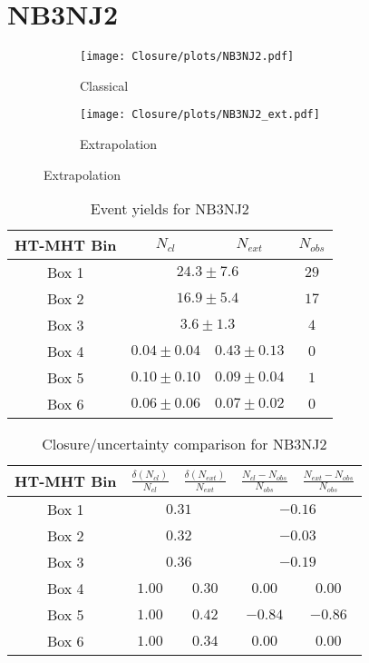\documentclass[11pt, oneside]{article}
\begin{document}
\clearpage


\section{NB3NJ2}

\begin{figure}[h]
\centering
\caption{NB3NJ2}
\begin{subfigure}[b]{0.49\textwidth}
\texttt{[image: Closure/plots/NB3NJ2.pdf]}
\caption{Classical}
\end{subfigure}
\begin{subfigure}[b]{0.49\textwidth}
\texttt{[image: Closure/plots/NB3NJ2\_ext.pdf]}
\caption{Extrapolation}
\end{subfigure}
\end{figure}


\begin{table}[h]
\centering
\caption{Event yields for NB3NJ2}
\begin{tabular}{|c|c|c|c|}
\hline
HT-MHT Bin & $N_{cl}$ & $N_{ext}$ & $N_{obs}$ \\
\hline
Box 1 & \multicolumn{2}{c|}{$24.3\pm7.6$} & $ 29$ \\ 
Box 2 & \multicolumn{2}{c|}{$16.9\pm5.4$} & $ 17$ \\ 
Box 3 & \multicolumn{2}{c|}{$3.6\pm1.3$} & $  4$ \\ 
\hline 
Box 4 & $0.04\pm0.04$ & $0.43\pm0.13$ & $  0$ \\ 
Box 5 & $0.10\pm0.10$ & $0.09\pm0.04$ & $  1$ \\ 
Box 6 & $0.06\pm0.06$ & $0.07\pm0.02$ & $  0$ \\ 
\hline
\end{tabular}
\end{table}


\begin{table}[h]
\centering
\caption{Closure/uncertainty comparison for NB3NJ2}
\begin{tabular}{|c|c|c|c|c|}
\hline
HT-MHT Bin & $\frac{\delta(N_{cl})}{N_{cl}}$ & $\frac{\delta(N_{ext})}{N_{ext}}$ & $\frac{N_{cl}-N_{obs}}{N_{obs}}$ &  $\frac{N_{ext}-N_{obs}}{N_{obs}}$ \\
\hline
Box 1 & \multicolumn{2}{c|}{$0.31$} & \multicolumn{2}{c|}{$-0.16$} \\ 
Box 2 & \multicolumn{2}{c|}{$0.32$} & \multicolumn{2}{c|}{$-0.03$} \\ 
Box 3 & \multicolumn{2}{c|}{$0.36$} & \multicolumn{2}{c|}{$-0.19$} \\ 
\hline 
Box 4 & $1.00$ & $0.30$ & $0.00$ & $0.00$ \\ 
Box 5 & $1.00$ & $0.42$ & $-0.84$ & $-0.86$ \\ 
Box 6 & $1.00$ & $0.34$ & $0.00$ & $0.00$ \\ 
\hline
\end{tabular}
\end{table}
\end{document}
